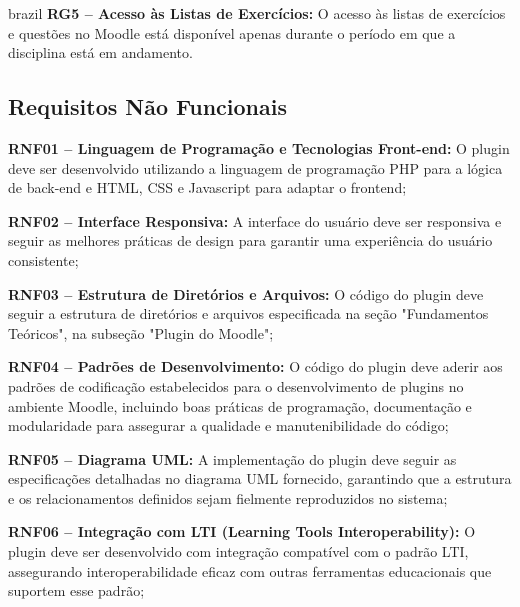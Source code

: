 \begin{otherlanguage*}{brazil}
\textbf{RG5 – Acesso às Listas de Exercícios:} O acesso às listas de exercícios e questões no Moodle está disponível apenas durante o período em que a disciplina está em andamento.

\vspace{12pt}

\subsection{Requisitos Não Funcionais}

\textbf{RNF01 – Linguagem de Programação e Tecnologias Front-end:} O plugin deve ser desenvolvido utilizando a linguagem de programação PHP para a lógica de back-end e HTML, CSS e Javascript para adaptar o frontend;

\vspace{12pt}

\textbf{RNF02 – Interface Responsiva:} A interface do usuário deve ser responsiva e seguir as melhores práticas de design para garantir uma experiência do usuário consistente;

\vspace{12pt}

\textbf{RNF03 – Estrutura de Diretórios e Arquivos:} O código do plugin deve seguir a estrutura de diretórios e arquivos especificada na seção "Fundamentos Teóricos", na subseção "Plugin do Moodle";

\vspace{12pt}

\textbf{RNF04 – Padrões de Desenvolvimento:} O código do plugin deve aderir aos padrões de codificação estabelecidos para o desenvolvimento de plugins no ambiente Moodle, incluindo boas práticas de programação, documentação e modularidade para assegurar a qualidade e manutenibilidade do código;

\vspace{12pt}

\textbf{RNF05 – Diagrama UML:} A implementação do plugin deve seguir as especificações detalhadas no diagrama UML fornecido, garantindo que a estrutura e os relacionamentos definidos sejam fielmente reproduzidos no sistema;

\vspace{12pt}

\textbf{RNF06 – Integração com LTI (Learning Tools Interoperability):} O plugin deve ser desenvolvido com integração compatível com o padrão LTI, assegurando interoperabilidade eficaz com outras ferramentas educacionais que suportem esse padrão;


\end{otherlanguage*}
